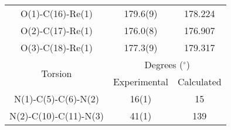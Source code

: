 \begin{table}[htbp]
\begin{tabular}{ccc}
    O(1)-C(16)-Re(1) & 179.6(9) & 178.224 \\
    O(2)-C(17)-Re(1) & 176.0(8) & 176.907 \\ 
    O(3)-C(18)-Re(1) & 177.3(9) & 179.317 \\ \midrule
    \multirow{2}{*}{Torsion} & \multicolumn{2}{c}{Degrees ($^\circ$)} \\ \cline{2-3}
     & Experimental & Calculated \\ \midrule
    N(1)-C(5)-C(6)-N(2) &  16(1) & 15\\
    N(2)-C(10)-C(11)-N(3) & 41(1) & 139\\
    \bottomrule
    \end{tabular}%
  \label{tab.da1}%
\end{table}%


